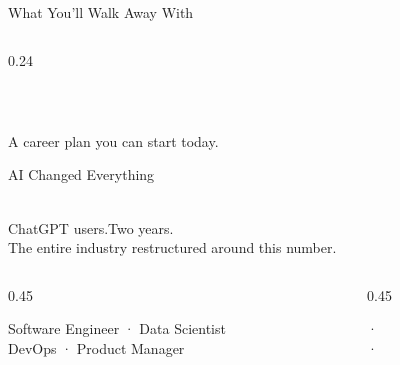 \begin{frame}{What You'll Walk Away With}
\begin{columns}[c]
\begin{column}{0.24\textwidth}
\begin{center}
\\[0.3em]
      {\footnotesize{}}
    \end{center}
  \end{column}
\end{columns}
\vspace{1.4em}
\begin{center}
  {\large{}  A career plan you can start today.}
\end{center}
\end{frame}


\begin{frame}{AI Changed Everything}
\begin{center}
  {\fontsize{48}{56}\selectfont{}}\\[0.4em]
  {\large ChatGPT users.\quad Two years.}\\[1em]
  {\normalsize The entire industry restructured around this number.}\\[1.4em]
  \begin{columns}[t]
    \begin{column}{0.45\textwidth}
      \begin{highlightbox}[Before (2022)]
        \footnotesize Software Engineer · Data Scientist\\
        DevOps · Product Manager
      \end{highlightbox}
    \end{column}
    \begin{column}{0.45\textwidth}
      \begin{keybox}[After (2024--2026)]
        \footnotesize {} · \\
         · 
      \end{keybox}
    \end{column}
  \end{columns}
\end{center}
\vspace{0.6em}
{\footnotesize{}}
\end{frame}

